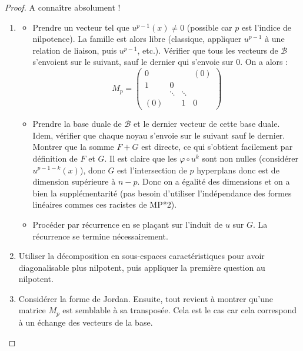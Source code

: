 \documentclass[french,a4paper]{article}
\theoremstyle{plain}
\theoremstyle{definition}
\theoremstyle{remark}
\begin{document}
\begin{proof}
	A connaître absolument !
	\begin{enumerate}
		\item \begin{itemize}
			\item Prendre un vecteur tel que $u^{p-1}(x)\ne 0$ (possible car $p$ est l'indice de nilpotence). La famille est alors libre (classique, appliquer $u^{p-1}$ à une relation de liaison, puis $u^{p-1}$, etc.). Vérifier que tous les vecteurs de $\mathcal{B}$ s'envoient sur le suivant, sauf le dernier qui s'envoie sur $0$. On a alors : $$M_p=\begin{pmatrix}
				0&&&(0)\\
				1&0&&\\
				&\ddots&\ddots&\\
				(0)&&1&0
			\end{pmatrix}$$
			\item Prendre la base duale de $\mathcal{B}$ et le dernier vecteur de cette base duale. Idem, vérifier que chaque noyau s'envoie sur le suivant sauf le dernier. Montrer que la somme $F+G$ est directe, ce qui s'obtient facilement par définition de $F$ et $G$. Il est claire que les $\varphi\circ u^k$ sont non nulles (considérer $u^{p-1-k}(x)$), donc $G$ est l'intersection de $p$ hyperplans donc est de dimension supérieure à $n-p$. Donc on a égalité des dimensions et on a bien la supplémentarité (pas besoin d'utiliser l'indépendance des formes linéaires commes ces racistes de MP*2).
			\item Procéder par récurrence en se plaçant sur l'induit de $u$ sur $G$. La récurrence se termine nécessairement.
		\end{itemize}
		\item Utiliser la décomposition en sous-espaces caractéristiques pour avoir diagonalisable plus nilpotent, puis appliquer la première question au nilpotent.
		\item Considérer la forme de Jordan. Ensuite, tout revient à montrer qu'une matrice $M_p$ est semblable à sa transposée. Cela est le cas car cela correspond à un échange des vecteurs de la base.
	\end{enumerate}
\end{proof}
\end{document}

